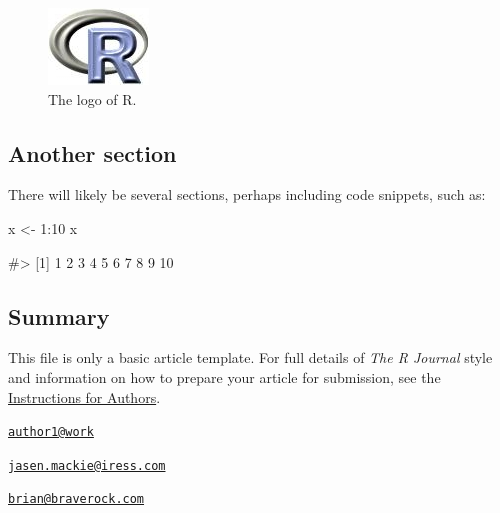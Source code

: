 \begin{figure}[htbp]
  \centering
  \includegraphics{Rlogo}
  \caption{The logo of R.}
  \label{figure:rlogo}
\end{figure}

\hypertarget{another-section}{%
\subsection{Another section}\label{another-section}}

There will likely be several sections, perhaps including code snippets,
such as:

\begin{Schunk}
\begin{Sinput}
x <- 1:10
x
\end{Sinput}
\begin{Soutput}
#>  [1]  1  2  3  4  5  6  7  8  9 10
\end{Soutput}
\end{Schunk}

\hypertarget{summary}{%
\subsection{Summary}\label{summary}}

This file is only a basic article template. For full details of
\emph{The R Journal} style and information on how to prepare your
article for submission, see the
\href{https://journal.r-project.org/share/author-guide.pdf}{Instructions
for Authors}.




\address{%
Vito Lestingi\\
Student - University of Rome\\
line 1\\ line 2\\
}
\href{mailto:author1@work}{\nolinkurl{author1@work}}

\address{%
Jasen K Mackie\\
Algorithmic Trading Services - Iress\\
line 1\\ line 2\\
}
\href{mailto:jasen.mackie@iress.com}{\nolinkurl{jasen.mackie@iress.com}}

\address{%
Brian G Peterson\\
TODO\\
line 1\\ line 2\\
}
\href{mailto:brian@braverock.com}{\nolinkurl{brian@braverock.com}}

